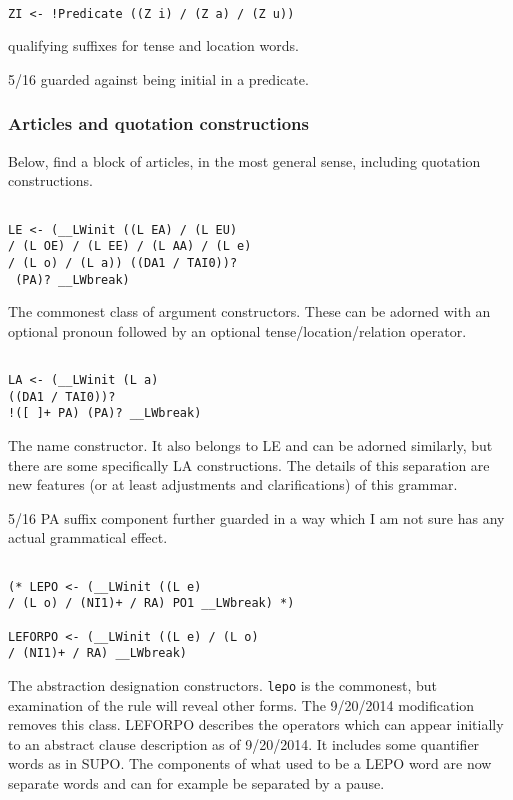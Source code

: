 \documentclass[12pt]{article}
\begin{document}
\begin{verbatim}

ZI <- !Predicate ((Z i) / (Z a) / (Z u))

\end{verbatim}

qualifying suffixes for tense and location words.

5/16 guarded against being initial in a predicate.

\subsubsection{Articles and quotation constructions}

Below, find a block of articles, in the most general sense, including quotation constructions.

\begin{verbatim}

LE <- (__LWinit ((L EA) / (L EU) 
/ (L OE) / (L EE) / (L AA) / (L e) 
/ (L o) / (L a)) ((DA1 / TAI0))?
 (PA)? __LWbreak)

\end{verbatim}

The commonest class of argument constructors.  These can be adorned with an optional pronoun followed by an optional
tense/location/relation operator.

\begin{verbatim}

LA <- (__LWinit (L a) 
((DA1 / TAI0))? 
!([ ]+ PA) (PA)? __LWbreak)

\end{verbatim}

The name constructor.  It also belongs to LE and can be adorned similarly, but there are some specifically LA constructions.
The details of this separation are new features (or at least adjustments and clarifications) of this grammar.

5/16 PA suffix component further guarded in a way which I am not sure has any actual grammatical effect.

\begin{verbatim}

(* LEPO <- (__LWinit ((L e) 
/ (L o) / (NI1)+ / RA) PO1 __LWbreak) *)

LEFORPO <- (__LWinit ((L e) / (L o) 
/ (NI1)+ / RA) __LWbreak)

\end{verbatim}

The abstraction designation constructors.  {\tt lepo} is the commonest, but examination of the rule will reveal other forms.  The 9/20/2014 modification removes this class.
LEFORPO describes the operators which can appear initially to an abstract clause description as of 9/20/2014.  It includes some quantifier words as in SUPO.  The components
of what used to be a LEPO word are now separate words and can for example be separated by a pause.
\end{document}
